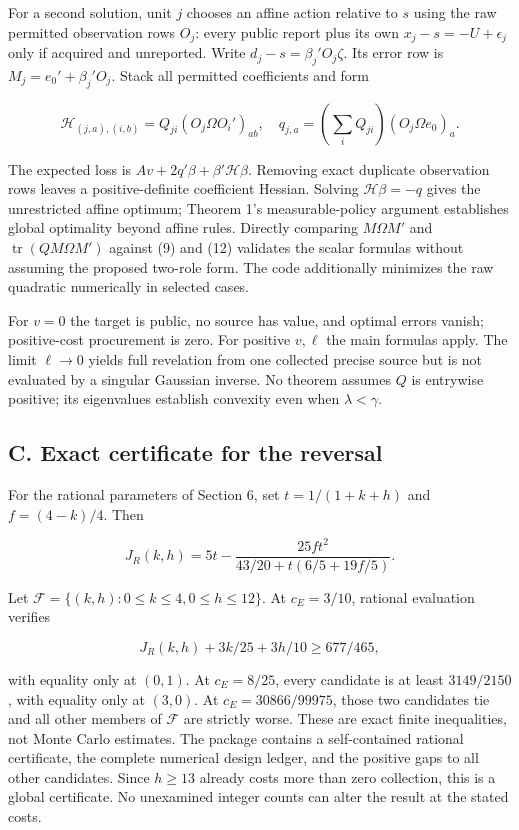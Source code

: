 \documentclass[
  11pt,
]{article}
\begin{document}
For a second solution, unit \(j\) chooses an affine action relative to
\(s\) using the raw permitted observation rows \(O_j\): every public
report plus its own \(x_j-s=-U+\epsilon_j\) only if acquired and
unreported. Write \(d_j-s=\beta_j'O_j\zeta\). Its error row is
\(M_j=e_0'+\beta_j'O_j\). Stack all permitted coefficients and form

\[\mathcal H_{(j,a),(i,b)}=Q_{ji}(O_j\Omega O_i')_{ab},\quad
q_{j,a}=\left(\sum_iQ_{ji}\right)(O_j\Omega e_0)_a.\]

The expected loss is \(Av+2q'\beta+\beta'\mathcal H\beta\). Removing
exact duplicate observation rows leaves a positive-definite coefficient
Hessian. Solving \(\mathcal H\beta=-q\) gives the unrestricted affine
optimum; Theorem 1's measurable-policy argument establishes global
optimality beyond affine rules. Directly comparing \(M\Omega M'\) and
\(\operatorname{tr}(QM\Omega M')\) against (9) and (12) validates the
scalar formulas without assuming the proposed two-role form. The code
additionally minimizes the raw quadratic numerically in selected cases.

For \(v=0\) the target is public, no source has value, and optimal
errors vanish; positive-cost procurement is zero. For positive
\(v,\ell\) the main formulas apply. The limit \(\ell\to0\) yields full
revelation from one collected precise source but is not evaluated by a
singular Gaussian inverse. No theorem assumes \(Q\) is entrywise
positive; its eigenvalues establish convexity even when
\(\lambda<\gamma\).

\subsection{C. Exact certificate for the
reversal}\label{c.-exact-certificate-for-the-reversal}

For the rational parameters of Section 6, set \(t=1/(1+k+h)\) and
\(f=(4-k)/4\). Then

\[J_R(k,h)=5t-\frac{25ft^2}{43/20+t(6/5+19f/5)}.\]

Let \(\mathcal F=\{(k,h):0\leq k\leq4,0\leq h\leq12\}\). At
\(c_E=3/10\), rational evaluation verifies

\[J_R(k,h)+3k/25+3h/10\geq677/465,\]

with equality only at \((0,1)\). At \(c_E=8/25\), every candidate is at
least \(3149/2150\), with equality only at \((3,0)\). At
\(c_E=30866/99975\), those two candidates tie and all other members of
\(\mathcal F\) are strictly worse. These are exact finite inequalities,
not Monte Carlo estimates. The package contains a self-contained
rational certificate, the complete numerical design ledger, and the
positive gaps to all other candidates. Since \(h\geq13\) already costs
more than zero collection, this is a global certificate. No unexamined
integer counts can alter the result at the stated costs.
\end{document}
